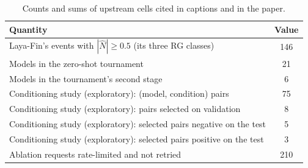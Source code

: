 \begin{table}[htbp]
\centering
\small
\begin{threeparttable}
\caption{Counts and sums of upstream cells cited in captions and in the paper.}\label{tab:a-derived}
\begin{tabular}{@{}lS[table-format=3.0]@{}}
\toprule
Quantity & {Value} \\
\midrule
Laya-Fin's events with $|\hat N| \geq 0.5$ (its three RG classes) & 146 \\
Models in the zero-shot tournament & 21 \\
Models in the tournament's second stage & 6 \\
Conditioning study (exploratory): (model, condition) pairs & 75 \\
Conditioning study (exploratory): pairs selected on validation & 8 \\
Conditioning study (exploratory): selected pairs negative on the test & 5 \\
Conditioning study (exploratory): selected pairs positive on the test & 3 \\
Ablation requests rate-limited and not retried & 210 \\
\bottomrule
\end{tabular}
\end{threeparttable}
\end{table}
